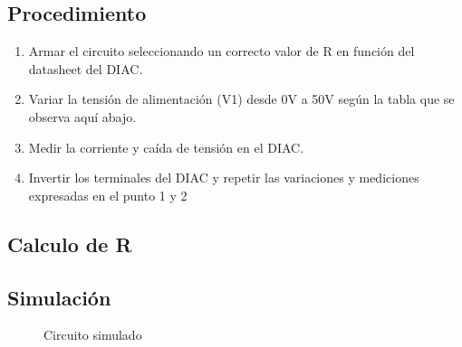 \subsection{Procedimiento}
\begin{enumerate}
  \item Armar el circuito seleccionando un correcto valor de R en función del
    datasheet del DIAC.
  \item Variar la tensión de alimentación (V1) desde 0V a 50V según la tabla que se
    observa aquí abajo.
  \item Medir la corriente y caída de tensión en el DIAC.
  \item Invertir los terminales del DIAC y repetir las variaciones y mediciones
    expresadas en el punto 1 y 2
\end{enumerate}
\subsection{Calculo de R} %
\subsection{Simulación}
\begin{figure}[H]
  \begin{center}
  \end{center}
  \caption{Circuito simulado}
  \label{fig:CircuitoPrimeraParte}
\end{figure}
\begin{center}
\end{center}
